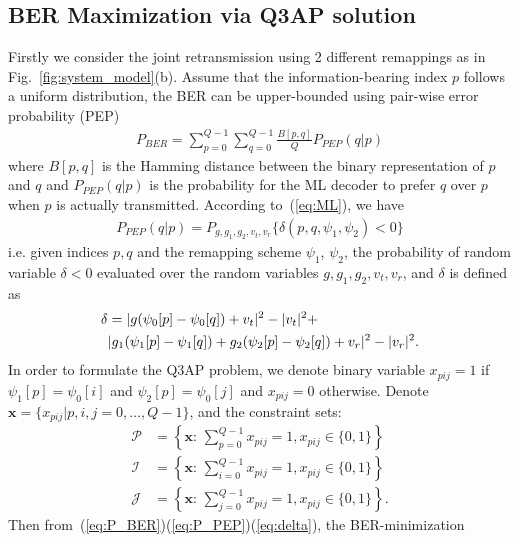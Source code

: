 \documentclass[conference]{IEEEtran}
\begin{document}
\subsection{BER Maximization via Q3AP solution}
Firstly we consider the joint retransmission using 2 different remappings
as in Fig.~\ref{fig:system_model}(b). Assume that the information-bearing index
$p$ follows a uniform distribution, the BER can be upper-bounded using
pair-wise error probability (PEP)~\cite{harvind2005symbol}
\begin{align}
    P_{BER} = \sum_{p=0}^{Q - 1}\sum_{q=0}^{Q - 1}\frac{B[p,
    q]}{Q}P_{PEP}(q | p) \label{eq:P_BER}
\end{align}
where $B[p,q]$ is the Hamming distance between the binary representation of $p$
and $q$ and $P_{PEP}(q | p)$ is the probability for the ML decoder to prefer $q$
over $p$ when $p$ is actually transmitted. According to~(\ref{eq:ML}), we have
\begin{align}
    P_{PEP}(q | p) = P_{g,g_1,g_2,v_t,v_r}\{\delta(p,q,\psi_1,\psi_2) < 0\}
    \label{eq:P_PEP}
\end{align}
i.e. given indices $p, q$ and the remapping scheme $\psi_1$, $\psi_2$, the
probability of random variable $\delta<0$ evaluated over the random variables
$g,g_1,g_2,v_t,v_r$, and $\delta$ is defined as
\begin{align}
    \delta & = |g(\psi_0[p] - \psi_0[q]) + v_t|^2 - |v_t|^2 +\notag\\ 
    &
    |g_1(\psi_1[p] - \psi_1[q])+g_2(\psi_2[p] - \psi_2[q])+v_r|^2 -
    |v_r|^2.
    \label{eq:delta}
\end{align}
In order to formulate the Q3AP problem, we denote binary variable $x_{pij} = 1$
if $\psi_1[p] = \psi_0[i]$ and $\psi_2[p] = \psi_0[j]$ and $x_{pij} = 0$
otherwise.
Denote $\mathbf{x} = \{x_{pij}|p,i,j=0,\ldots,Q-1\}$, and the
constraint sets:
\begin{subequations}
    \begin{align}
        \mathcal{P} & = \left\{\mathbf{x}:\,\sum_{p=0}^{Q-1}x_{pij} = 1,
        x_{pij}\in\{0, 1\}\right\}
        \\
        \mathcal{I} & = \left\{\mathbf{x}:\,\sum_{i=0}^{Q-1}x_{pij} = 1,
        x_{pij}\in\{0, 1\}\right\}
        \\
        \mathcal{J} & = \left\{\mathbf{x}:\,\sum_{j=0}^{Q-1}x_{pij} = 1,
        x_{pij}\in\{0, 1\}\right\}.
    \end{align}
\end{subequations}
Then from~(\ref{eq:P_BER})(\ref{eq:P_PEP})(\ref{eq:delta}), the BER-minimization
\end{document}
